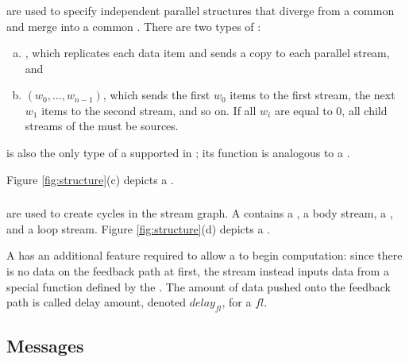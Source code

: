 \subsubsection{\splitjoins}

{\splitjoins} are used to specify independent parallel structures
that diverge from a common {\splitter} and merge into a common
{\joiner}.  There are two types of {\splitters}:
\begin{enumerate}[(a)]
\item %
{\duplicate}, which replicates each data item and sends a copy to
each parallel stream, and

\item %
{\roundrobin} $(w_0,\dots, w_{n-1})$, which sends the first $w_0$
items to the first stream, the next $w_1$ items to the second
stream, and so on.  If all $w_i$ are equal to $0$, all child
streams of the {\splitjoin} must be sources.
\end{enumerate}

{\roundrobin} is also the only type of a {\joiner} supported in
{\StreamIt}; its function is analogous to a {\roundrobin} {\splitter}.

Figure \ref{fig:structure}(c) depicts a
{\splitjoin}.

\subsubsection{{\feedbackloops}}
\label{sec:explain-fl}

{{\feedbackloops}} are used to create cycles in the stream graph. A
{{\feedbackloop}} contains a {\joiner}, a body stream, a {\splitter}, and
a loop stream.  Figure \ref{fig:structure}(d) depicts a
{{\feedbackloop}}.

A {{\feedbackloop}} has an additional feature required to allow a
{{\feedbackloop}} to begin computation: since there is no data on
the feedback path at first, the stream instead inputs data from a
special function defined by the {{\feedbackloop}}.  The amount of
data pushed onto the feedback path is called delay amount, denoted
$delay_{fl}$, for a {{\feedbackloop}} $fl$.

\subsection{Messages}
\label{sec:streamit:messages}

